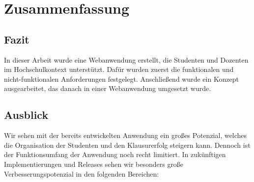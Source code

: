 \chapter{Zusammenfassung}

\section{Fazit} %
In dieser Arbeit wurde eine Webanwendung erstellt, die Studenten und Dozenten im Hochschulkontext unterstützt.
Dafür wurden zuerst die funktionalen und nicht-funktionalen Anforderungen festgelegt.
Anschließend wurde ein Konzept ausgearbeitet, das danach in einer Webanwendung umgesetzt wurde.

\section{Ausblick}
Wir sehen mit der bereits entwickelten Anwendung ein großes Potenzial, welches die Organisation der Studenten und den Klausurerfolg steigern kann. Dennoch ist der Funktionsumfang der Anwendung noch recht limitiert.
In zukünftigen Implementierungen und Releases sehen wir besonders große Verbesserungspotenzial in den folgenden Bereichen:
